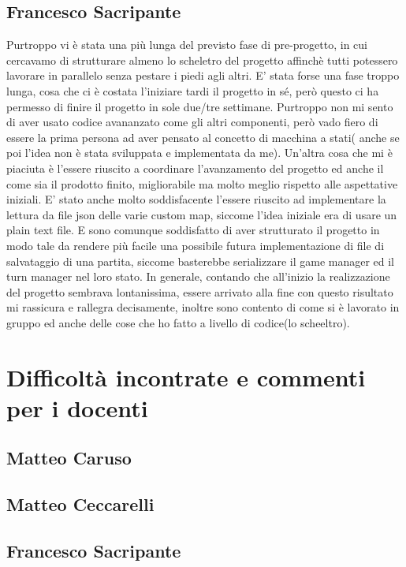 \documentclass[a4paper,12pt]{report}
\begin{document}
\subsection{Francesco Sacripante}
Purtroppo vi è stata una più lunga del previsto fase di pre-progetto, in cui cercavamo di strutturare almeno lo scheletro del progetto
affinchè tutti potessero lavorare in parallelo senza pestare i piedi agli altri.
E' stata forse una fase troppo lunga, cosa che ci è costata l'iniziare tardi il progetto in sé, però questo ci ha permesso di finire il progetto in sole due/tre settimane.
Purtroppo non mi sento di aver usato codice avananzato come gli altri componenti, però vado fiero di essere la prima persona ad aver pensato al concetto di macchina a stati( anche se poi l'idea non è stata sviluppata e implementata da me).
Un'altra cosa che mi è piaciuta è l'essere riuscito a coordinare l'avanzamento del progetto ed anche il come sia il prodotto finito, migliorabile ma molto meglio rispetto alle aspettative iniziali.
E' stato anche molto soddisfacente l'essere riuscito ad implementare la lettura da file json delle varie custom map, siccome l'idea iniziale era di usare un plain text file.
E sono comunque soddisfatto di aver strutturato il progetto in modo tale da rendere più facile una possibile futura implementazione di file di salvataggio di una partita, siccome basterebbe serializzare il game manager ed il turn manager nel loro stato.
In generale, contando che all'inizio la realizzazione del progetto sembrava lontanissima, essere arrivato alla fine con questo risultato mi rassicura e rallegra decisamente, inoltre sono contento di come si è lavorato in gruppo ed anche delle cose che ho fatto a livello di codice(lo scheeltro).

\section{Difficoltà incontrate e commenti per i docenti}
\subsection{Matteo Caruso}
\subsection{Matteo Ceccarelli}
\subsection{Francesco Sacripante}
\end{document}
